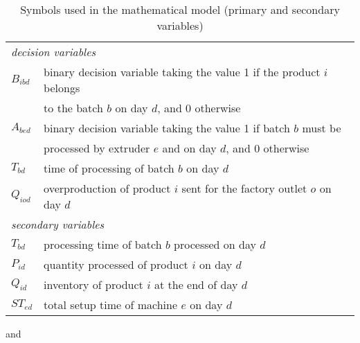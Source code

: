 \begin{table}[h!]
\begin{center}
\footnotesize
	\begin{tabular}{ l l } 

		\multicolumn{2}{l}{\emph{decision variables}} \\ 
		
		$B_{ibd}$ & binary decision variable taking the value 1 if the product $i$ belongs \\
		& to the batch $b$ on day $d$, and 0 otherwise \\
		$A_{bed}$ &  binary decision variable taking the value 1 if batch $b$ must be \\
		&            processed by extruder $e$ and on day $d$, and 0 otherwise \\
       	$T_{bd}$ & time of processing of batch $b$ on day $d$ \\
       	$Q_{iod}$ & overproduction of product $i$ sent for the factory outlet $o$ on day $d$ \\
       	
       	\multicolumn{2}{l}{\emph{secondary variables}} \\ 
       	
		$T_{bd}$ & processing time of batch $b$ processed on day $d$ \\
		$P_{id}$ & quantity processed of product $i$ on day $d$ \\
		$Q_{id}$ & inventory of product $i$ at the end of day $d$ \\ 
		$ST_{ed}$ & total setup time of machine $e$ on day $d$
	\end{tabular}
\caption{Symbols used in the mathematical model (primary and secondary variables)}
\label{tab:symbols}
\end{center}
\end{table}

and \cite{RefJ}
